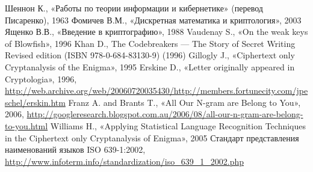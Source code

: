 \begin{thebibliography}{1}
 Шеннон К., «Работы по теории информации и кибернетике» (перевод Писаренко), 1963
 Фомичев В.М., «Дискретная математика и криптология», 2003
 Ященко В.В., «Введение в криптографию», 1988
 Vaudenay S., «On the weak keys of Blowfish», 1996
 Khan D., The Codebreakers --- The Story of Secret Writing Revised edition (ISBN 978-0-684-83130-9) (1996)
 Gillogly J., «Ciphertext only Cryptanalysis of the Enigma», 1995
 Erskine D., «Letter originally appeared in Cryptologia», 1996, \url{http://web.archive.org/web/20060720035430/http://members.fortunecity.com/jpeschel/erskin.htm}
 Franz A. and Brants T., «All Our N-gram are Belong to You», 2006, \url{http://googleresearch.blogspot.com.au/2006/08/all-our-n-gram-are-belong-to-you.html}
 Williams H., «Applying Statistical Language Recognition Techniques in the Ciphertext only Cryptanalysis of Enigma», 2005
 Стандарт представления наименований языков ISO 639-1:2002, \url{http://www.infoterm.info/standardization/iso_639_1_2002.php}
\end{thebibliography}
